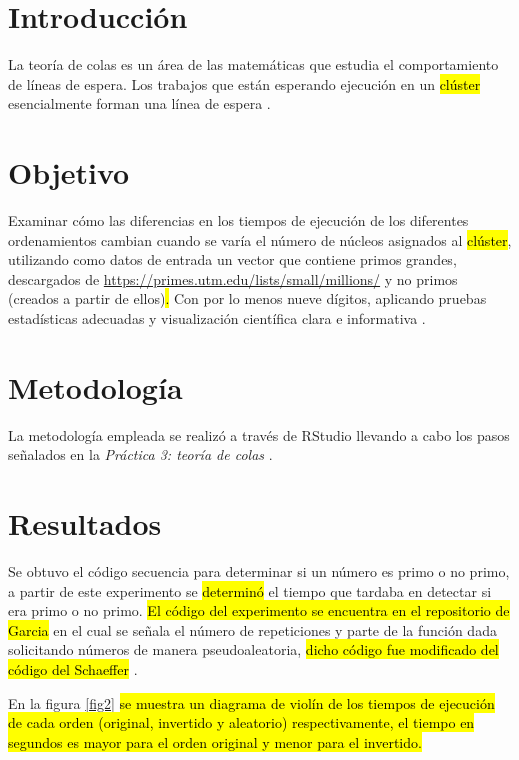 \documentclass[10pt,a4paper]{article}
\begin{document}
	\begin{multicols}{2}
		\section{Introducción} 
	La teoría de colas es un área de las matemáticas que estudia el comportamiento de líneas de espera. Los trabajos que están esperando ejecución en un \hl{cl\'uster} esencialmente forman una línea de espera \cite{p3}.

 

		\section{Objetivo} 
		Examinar cómo las diferencias en los tiempos de ejecución de los diferentes ordenamientos cambian cuando se varía el número de núcleos asignados al \hl{cl\'uster}, utilizando como datos de entrada un vector que contiene primos grandes, descargados de \url{https://primes.utm.edu/lists/small/millions/} y no primos (creados a partir de ellos)\hl{.} Con por lo menos nueve dígitos, aplicando pruebas estadísticas adecuadas y visualización científica clara e informativa \cite{p3}. 

\section{Metodología}
La metodología empleada se realizó a través de RStudio\cite{RStudio} llevando a cabo los pasos señalados en la \textit{Práctica 3: teoría de colas} \cite{p3}.\hl{ }

	
	\section{Resultados}
	Se obtuvo el código secuencia para determinar si un número es primo o no primo, a partir de este experimento se \hl{determin\'o} el tiempo que tardaba en detectar si era primo o no primo. \hl{El c\'odigo del experimento se encuentra en el repositorio de Garcia} \cite{gitadrian} en el cual se señala el número de repeticiones y parte de la función dada solicitando números de manera pseudoaleatoria, \hl{dicho c\'odigo fue modificado del c\'odigo del Schaeffer} \cite{p3gitdr}. 
	
	En la figura \ref{fig2} \hl{se muestra un diagrama de viol\'in de los tiempos de ejecuci\'on de cada orden (original, invertido y aleatorio) respectivamente, el tiempo en segundos es mayor para el orden original y menor para el invertido.}
	\vspace{1mm}
	

\end{multicols}
\end{document}
